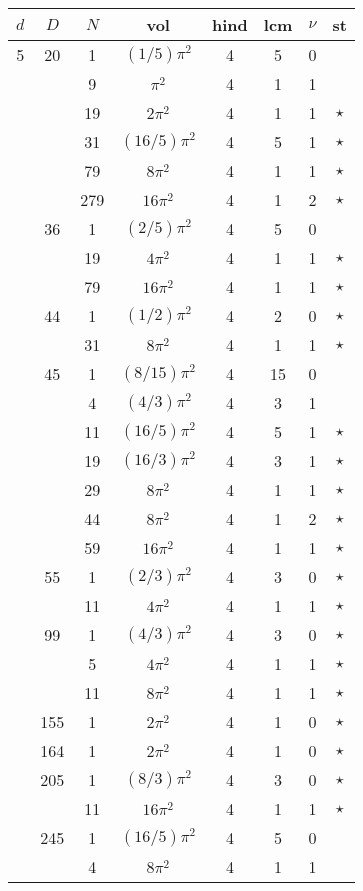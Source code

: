 \begin{tabular}{ccc|ccccc}
$d$ & $D$ & $N$ & vol & hind & lcm & $\nu$ & st\\
\hline
5 & 20 & 1 & $(1/5)\pi^2$ & 4 & 5 & 0 &  \\
 &  & 9 & $\pi^2$ & 4 & 1 & 1 &  \\
 &  & 19 & $2\pi^2$ & 4 & 1 & 1 & $\star$ \\
 &  & 31 & $(16/5)\pi^2$ & 4 & 5 & 1 & $\star$ \\
 &  & 79 & $8\pi^2$ & 4 & 1 & 1 & $\star$ \\
 &  & 279 & $16\pi^2$ & 4 & 1 & 2 & $\star$ \\
 & 36 & 1 & $(2/5)\pi^2$ & 4 & 5 & 0 &  \\
 &  & 19 & $4\pi^2$ & 4 & 1 & 1 & $\star$ \\
 &  & 79 & $16\pi^2$ & 4 & 1 & 1 & $\star$ \\
 & 44 & 1 & $(1/2)\pi^2$ & 4 & 2 & 0 & $\star$ \\
 &  & 31 & $8\pi^2$ & 4 & 1 & 1 & $\star$ \\
 & 45 & 1 & $(8/15)\pi^2$ & 4 & 15 & 0 &  \\
 &  & 4 & $(4/3)\pi^2$ & 4 & 3 & 1 &  \\
 &  & 11 & $(16/5)\pi^2$ & 4 & 5 & 1 & $\star$ \\
 &  & 19 & $(16/3)\pi^2$ & 4 & 3 & 1 & $\star$ \\
 &  & 29 & $8\pi^2$ & 4 & 1 & 1 & $\star$ \\
 &  & 44 & $8\pi^2$ & 4 & 1 & 2 & $\star$ \\
 &  & 59 & $16\pi^2$ & 4 & 1 & 1 & $\star$ \\
 & 55 & 1 & $(2/3)\pi^2$ & 4 & 3 & 0 & $\star$ \\
 &  & 11 & $4\pi^2$ & 4 & 1 & 1 & $\star$ \\
 & 99 & 1 & $(4/3)\pi^2$ & 4 & 3 & 0 & $\star$ \\
 &  & 5 & $4\pi^2$ & 4 & 1 & 1 & $\star$ \\
 &  & 11 & $8\pi^2$ & 4 & 1 & 1 & $\star$ \\
 & 155 & 1 & $2\pi^2$ & 4 & 1 & 0 & $\star$ \\
 & 164 & 1 & $2\pi^2$ & 4 & 1 & 0 & $\star$ \\
 & 205 & 1 & $(8/3)\pi^2$ & 4 & 3 & 0 & $\star$ \\
 &  & 11 & $16\pi^2$ & 4 & 1 & 1 & $\star$ \\
 & 245 & 1 & $(16/5)\pi^2$ & 4 & 5 & 0 &  \\
 &  & 4 & $8\pi^2$ & 4 & 1 & 1 &  \\

\end{tabular}

